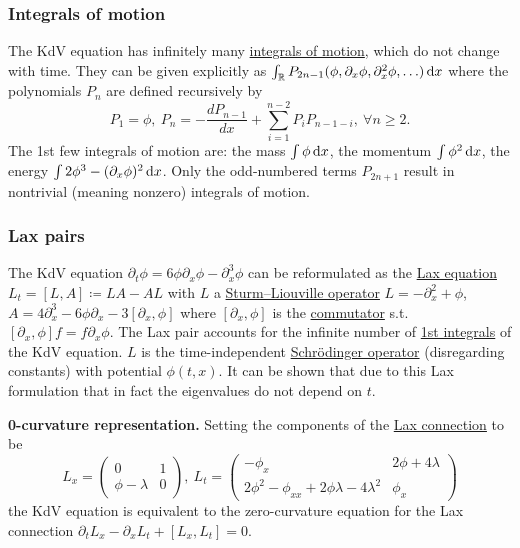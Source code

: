 \documentclass{article}
\begin{document}
\subsubsection{Integrals of motion}
The KdV equation has infinitely many \href{https://en.wikipedia.org/wiki/Integral_of_motion}{integrals of motion}, which do not change with time. They can be given explicitly as $\int_\mathbb{R} P_{2n - 1}(\phi,\partial_x\phi,\partial_x^2\phi,\ldots)\,{\rm d}x$ where the polynomials $P_n$ are defined recursively by
\begin{equation*}
	P_1 = \phi,\ P_n = -\frac{dP_{n-1}}{dx} + \sum_{i=1}^{n-2} P_iP_{n - 1 - i},\ \forall n\ge2.
\end{equation*}
The 1st few integrals of motion are: the mass $\int \phi\,{\rm d}x$, the momentum $\int \phi^2\,{\rm d}x$, the energy $\int 2\phi^3 - (\partial_x\phi)^2\,{\rm d}x$. Only the odd-numbered terms $P_{2n+1}$ result in nontrivial (meaning nonzero) integrals of motion.

\subsubsection{Lax pairs}
The KdV equation $\partial_t\phi = 6\phi\partial_x\phi - \partial_x^3\phi$ can be reformulated as the \href{https://en.wikipedia.org/wiki/Lax_equation}{Lax equation} $L_t = [L,A]\coloneqq LA - AL$ with $L$ a \href{https://en.wikipedia.org/wiki/Sturm%E2%80%93Liouville_operator}{Sturm--Liouville operator} $L = -\partial_x^2 + \phi$, $A = 4\partial_x^3 - 6\phi\partial_x - 3[\partial_x,\phi]$ where $[\partial_x,\phi]$ is the \href{https://en.wikipedia.org/wiki/Commutator#Identities_(ring_theory)}{commutator} s.t. $[\partial_x,\phi]f = f\partial_x\phi$. The Lax pair accounts for the infinite number of \href{https://en.wikipedia.org/wiki/First_integrals}{1st integrals} of the KdV equation. $L$ is the time-independent \href{https://en.wikipedia.org/wiki/Schr%C3%B6dinger_operator}{Schr\"odinger operator} (disregarding constants) with potential $\phi(t,x)$. It can be shown that due to this Lax formulation that in fact the eigenvalues do not depend on $t$.

{\bf0-curvature representation.} Setting the components of the \href{https://en.wikipedia.org/wiki/Lax_pair#zero-curvature_representation}{Lax connection} to be
\begin{equation*}
	L_x = \begin{pmatrix}
		0&1\\\phi - \lambda & 0
	\end{pmatrix},\ L_t = \begin{pmatrix}
		-\phi_x & 2\phi + 4\lambda\\2\phi^2 - \phi_{xx} + 2\phi\lambda - 4\lambda^2 & \phi_x
	\end{pmatrix}
\end{equation*}
the KdV equation is equivalent to the zero-curvature equation for the Lax connection $\partial_tL_x - \partial_xL_t + [L_x,L_t] = 0$.
\end{document}
